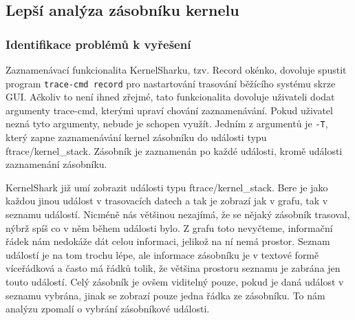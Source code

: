 \subsection{Lepší analýza zásobníku kernelu}

\subsubsection*{Identifikace problémů k vyřešení}
Zaznamenávací funkcionalita KernelSharku, tzv. Record okénko, dovoluje spustit program \texttt{trace-cmd record} pro nastartování trasování běžícího systému skrze GUI. Ačkoliv to není ihned zřejmé, tato funkcionalita dovoluje uživateli dodat argumenty trace-cmd, kterými upraví chování zaznamenávání. Pokud uživatel nezná tyto argumenty, nebude je schopen využít. Jedním z argumentů je \texttt{-T}, který zapne zaznamenávání kernel zásobníku do události typu ftrace/kernel\_stack. Zásobník je zaznamenán po každé události, kromě události zaznamenání zásobníku.

KernelShark již umí zobrazit události typu ftrace/kernel\_stack. Bere je jako každou jinou událost v trasovacích datech a tak je zobrazí jak v grafu, tak v seznamu událostí. Nicméně nás většinou nezajímá, že se nějaký zásobník trasoval, nýbrž spíš co v něm během události bylo. Z grafu toto nevyčteme, informační řádek nám nedokáže dát celou informaci, jelikož na ní nemá prostor. Seznam událostí je na tom trochu lépe, ale informace zásobníku je v textové formě víceřádková a často má řádků tolik, že většina prostoru seznamu je zabrána jen touto událostí. Celý zásobník je ovšem viditelný pouze, pokud je daná událost v seznamu vybrána, jinak se zobrazí pouze jedna řádka ze zásobníku. To nám analýzu zpomalí o vybrání zásobníkové události.

